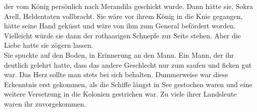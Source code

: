 der vom König persönlich nach Merandila geschickt wurde. Dann hätte sie, Sokra Arell, Heldentaten 
vollbracht. Sie wäre vor ihrem König in die Knie gegangen, hätte seine Hand geküsst und wäre von 
ihm zum General befördert worden. Vielleicht würde sie dann der rothaarigen Schnepfe zur Seite 
stehen. Aber die Liebe hatte sie zögern lassen.\\
Sie spuckte auf den Boden, in Erinnerung an den Mann. Ein Mann, der ihr 
deutlich gelehrt hatte, dass das andere Geschlecht nur zum saufen und ficken gut war. Das Herz 
sollte man stets bei sich behalten. Dummerweise war diese Erkenntnis erst gekommen, als die Schiffe 
längst in See gestochen waren und eine weitere Versetzung in die Kolonien gestrichen war. Zu viele 
ihrer Landsleute waren ihr zuvorgekommen.\\


